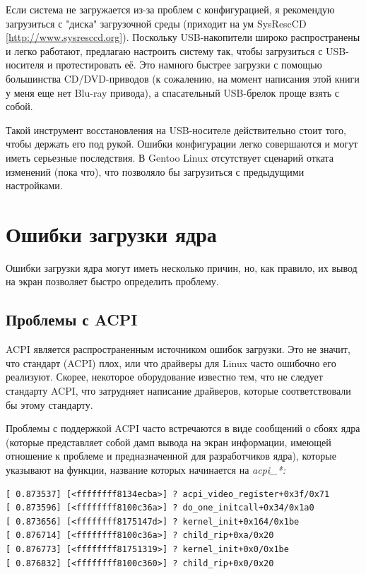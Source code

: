 \documentclass[10pt]{book}
\begin{document}
Если система не загружается из-за проблем с конфигурацией, я рекомендую загрузиться с "диска" загрузочной среды (приходит на ум SysRescCD [\url{http://www.sysresccd.org}]). Поскольку USB-накопители широко распространены и легко работают, предлагаю настроить систему так, чтобы загрузиться с USB-носителя и протестировать её. Это намного быстрее загрузки с помощью большинства CD/DVD-приводов (к сожалению, на момент написания этой книги у меня еще нет Blu-ray привода), а спасательный USB-брелок проще взять с собой.

Такой инструмент восстановления на USB-носителе  действительно стоит того, чтобы держать его под рукой. Ошибки конфигурации легко совершаются и могут иметь серьезные последствия. В Gentoo Linux отсутствует сценарий отката изменений (пока что), что позволяло бы загрузиться с предыдущими настройками. 

\section{Ошибки загрузки ядра}

Ошибки загрузки ядра могут иметь несколько причин, но, как правило, их вывод на экран позволяет быстро определить проблему.

\subsection{Проблемы с ACPI}

ACPI является распространенным источником ошибок загрузки. Это не значит, что стандарт (ACPI) плох, или что драйверы для Linux часто ошибочно его реализуют. Скорее, некоторое оборудование известно тем, что не следует стандарту ACPI, что затрудняет написание драйверов, которые соответствовали бы этому стандарту. 

Проблемы с поддержкой ACPI часто встречаются в виде сообщений о сбоях ядра (которые представляет собой дамп вывода на экран информации, имеющей отношение к проблеме и предназначенной для разработчиков ядра), которые указывают на функции, название которых  начинается на \textit{acpi\_*:}

\vspace{3mm}
\begin{tcolorbox}
\begin{lstlisting}
[ 0.873537] [<ffffffff8134ecba>] ? acpi_video_register+0x3f/0x71
[ 0.873596] [<ffffffff8100c36a>] ? do_one_initcall+0x34/0x1a0
[ 0.873656] [<ffffffff8175147d>] ? kernel_init+0x164/0x1be
[ 0.876714] [<ffffffff8100c36a>] ? child_rip+0xa/0x20
[ 0.876773] [<ffffffff81751319>] ? kernel_init+0x0/0x1be
[ 0.876832] [<ffffffff8100c360>] ? child_rip+0x0/0x20
\end{lstlisting}
\end{tcolorbox}
\end{document}

